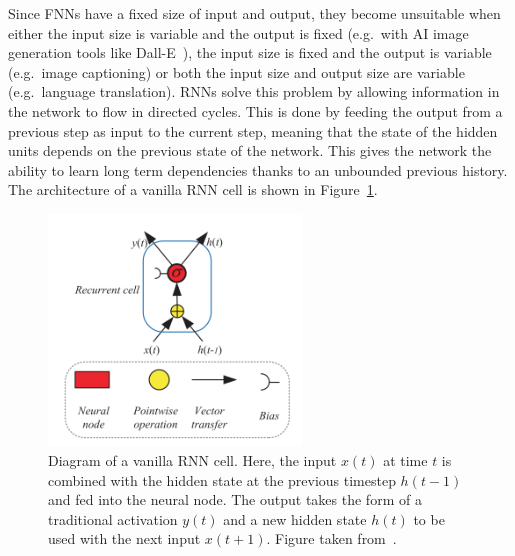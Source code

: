 Since FNNs have a fixed size of input and output, they become unsuitable when
either the input size is variable and the output is fixed (e.g.\ with AI image
generation tools like Dall-E~\cite{ramesh2021zero}), the input size is fixed and
the output is variable (e.g.\ image captioning) or both the input size and
output size are variable (e.g.\ language translation). RNNs solve this problem
by allowing information in the network to flow in directed cycles. This is done
by feeding the output from a previous step as input to the current step, meaning
that the state of the hidden units depends on the previous state of the network.
This gives the network the ability to learn long term dependencies thanks to an
unbounded previous history. The architecture of a vanilla RNN cell is shown in
Figure~\ref{fig:rnn_cell_example}.

\begin{figure}[ht]
  \centering
  \includegraphics[width=0.6\textwidth]{figures/rnn_cell_example.png}
  \caption{Diagram of a vanilla RNN cell. Here, the input $x(t)$ at time $t$ is
    combined with the hidden state at the previous timestep $h(t-1)$
    and fed into the neural node. The output takes the form of a traditional
    activation $y(t)$ and a new hidden state $h(t)$ to be used with the
    next input $x(t+1)$. Figure taken
  from~\cite{yu2019review}.}\label{fig:rnn_cell_example}
\end{figure}


